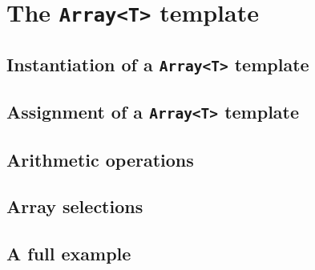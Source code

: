 \section{The {\tt Array<T>} template}

\subsection{Instantiation of a {\tt Array<T>} template}

\subsection{Assignment of a {\tt Array<T>} template}

\subsection{Arithmetic operations}

\subsection{Array selections}

\subsection{A full example}